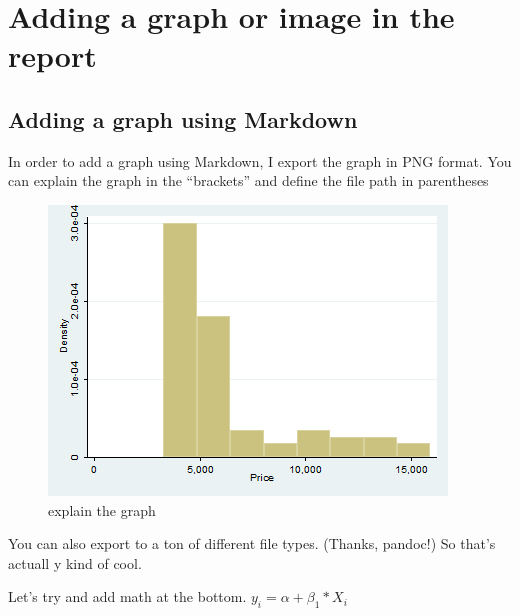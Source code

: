 \documentclass{article}
\begin{document}
\section{Adding a graph or image in the
report}\label{adding-a-graph-or-image-in-the-report}

\subsection{Adding a graph using
Markdown}\label{adding-a-graph-using-markdown}

In order to add a graph using Markdown, I export the graph in PNG
format. You can explain the graph in the ``brackets'' and define the
file path in parentheses

\begin{figure}[htbp]
\centering
\includegraphics{./graph.png}
\caption{explain the graph}
\end{figure}

You can also export to a ton of different file types. (Thanks, pandoc!)
So that's actuall y kind of cool.

Let's try and add math at the bottom. \(y_i=\alpha+\beta_1*X_i\)
\end{document}
